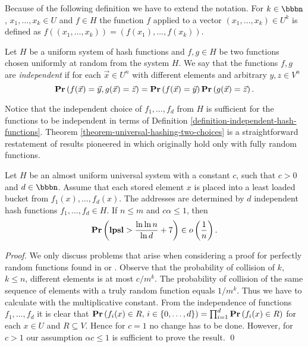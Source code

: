 Because of the following definition we have to extend the notation. For $k \in \bbbn$, $x_1, \dots, x_k \in U$ and $f \in H$ the function $f$ applied to a vector $(x_1, \dots, x_k) \in U^k$ is defined as $f((x_1, \dots, x_k)) = (f(x_1), \dots, f(x_k))$.
\begin{definition}
\label{definition-independent-hash-functions}
Let $H$ be a uniform system of hash functions and $f, g \in H$ be two functions chosen uniformly at random from the system $H$. We say that the functions $f, g$ are \emph{independent} if for each $\vec{x} \in U^n$ with different elements and arbitrary $y, z \in V^n$ $$\mathbf{Pr}\left(f(\vec{x}) = \vec{y}, g(\vec{x}) = \vec{z}\right) = \mathbf{Pr}\left(f(\vec{x}) = \vec{y}\right) \mathbf{Pr}\left(g(\vec{x}) = \vec{z}\right).$$
\end{definition}

Notice that the independent choice of $f_1, \dots, f_d$ from $H$ is sufficient for the functions to be independent in terms of Definition \ref{definition-independent-hash-functions}. Theorem \ref{theorem-universal-hashing-two-choices} is a straightforward restatement of results pioneered in \cite{DBLP:conf/stoc/AzarBKU94} which originally hold only with fully random functions.

\begin{theorem}
\label{theorem-universal-hashing-two-choices}
Let $H$ be an almost uniform universal system with a constant $c$, such that $c > 0$ and $d \in \bbbn$. Assume that each stored element $x$ is placed into a least loaded bucket from $f_1(x), \dots, f_d(x)$. The addresses are determined by $d$ independent hash functions $f_1, \dots, f_d \in H$. If $n \leq m$ and $c \alpha \leq 1$, then $$\mathbf{Pr}\left(\mathbf{lpsl} > \frac{\ln \ln n}{\ln d} + 7\right) \in o\left(\frac{1}{n}\right).$$
\end{theorem}
\begin{proof}
We only discuss problems that arise when considering a proof for perfectly random functions found in \cite{Mitzenmacher:2005:PCR:1076315} or \cite{DBLP:conf/stoc/AzarBKU94}. Observe that the probability of collision of $k$, $k \leq n$, different elements is at most ${c}/{m^k}$. The probability of collision of the same sequence of elements with a truly random function equals ${1}/{m^k}$. Thus we have to calculate with the multiplicative constant. From the independence of functions $f_1, \dots, f_d$ it is clear that $\mathbf{Pr}\left(f_i(x) \in R,\, i \in \{0, \dots, d\}\right) = \prod_{i = 1}^{d}\mathbf{Pr}\left(f_i(x) \in R\right)$ for each $x \in U$ and $R \subseteq V$. Hence for $c = 1$ no change has to be done. However, for $c > 1$ our assumption $\alpha c \leq 1$ is sufficient to prove the result.
\qed
\end{proof}

